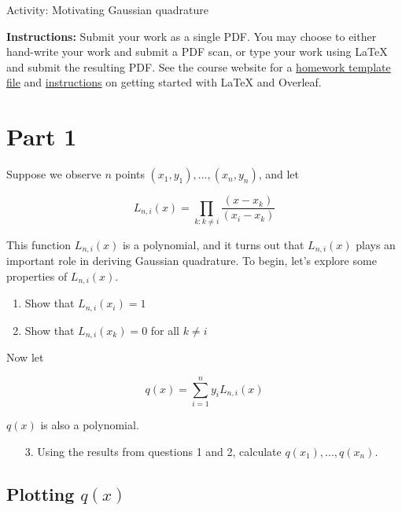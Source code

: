 \documentclass[11pt]{article}
\begin{document}
\begin{center}
\Large
Activity: Motivating Gaussian quadrature \\
\normalsize
\vspace{5mm}
\end{center}

\noindent \textbf{Instructions:} Submit your work as a single PDF. You may choose to either hand-write your work and submit a PDF scan, or type your work using LaTeX and submit the resulting PDF. See the course website for a \href{https://sta711-s25.github.io/homework/hw_template.tex}{homework template file} and \href{https://sta711-s25.github.io/homework/latex_instructions/}{instructions} on getting started with LaTeX and Overleaf.

\section*{Part 1}

Suppose we observe $n$ points $(x_1, y_1),...,(x_n, y_n)$, and let

$$L_{n,i}(x) = \prod \limits_{k : k \neq i} \frac{(x - x_k)}{(x_i - x_k)}$$

\noindent This function $L_{n,i}(x)$ is a polynomial, and it turns out that $L_{n,i}(x)$ plays an important role in deriving Gaussian quadrature. To begin, let's explore some properties of $L_{n,i}(x)$.

\begin{enumerate}
\item Show that $L_{n,i}(x_i) = 1$

\vspace{3cm}

\item Show that $L_{n,i}(x_k) = 0$ for all $k \neq i$

\vspace{3cm}
\end{enumerate}

\noindent Now let

$$q(x) = \sum \limits_{i=1}^n y_i L_{n,i}(x)$$

\noindent $q(x)$ is also a polynomial.

\begin{enumerate}
\item[3.] Using the results from questions 1 and 2, calculate $q(x_1),...,q(x_n)$.
\end{enumerate}

\newpage

\subsection*{Plotting $q(x)$}
\end{document}
